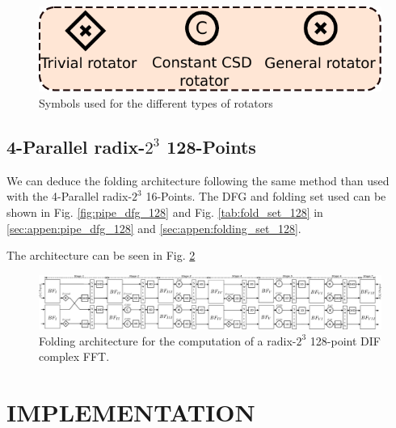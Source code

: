 \documentclass[journal,comsoc]{IEEEtran}
\begin{document}
\begin{figure}[htbp]%
\centering
 \includegraphics[width=0.6\linewidth]{Diagramas/miSeccionFiguras/Rotadores}%
\caption{Symbols used for the different types of rotators}
\label{fig:rotators}
\end{figure}

\subsection{4-Parallel radix-$2^3$ 128-Points}
We can deduce the folding architecture following the same method than used with the 4-Parallel radix-$2^3$ 16-Points. The DFG and folding set used can be shown in Fig. \ref{fig:pipe_dfg_128} and Fig. \ref{tab:fold_set_128} in \ref{sec:appen:pipe_dfg_128} and \ref{sec:appen:folding_set_128}.

The architecture can be seen in Fig. \ref{fig:circ-folding-128}

\begin{figure}[htbp]%
\centering
 \includegraphics[width=0.95\linewidth]{Diagramas/miSeccionFiguras/4Paralelo128pRadix8}%
\caption{Folding architecture for the computation of a radix-$2^3$ 128-point DIF complex FFT.}
\label{fig:circ-folding-128}
\end{figure}


\section{IMPLEMENTATION}
\end{document}
